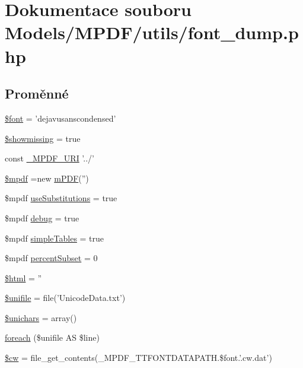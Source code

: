 \hypertarget{font__dump_8php}{\section{Dokumentace souboru Models/\-M\-P\-D\-F/utils/font\-\_\-dump.php}
\label{font__dump_8php}
}
\subsection*{Proměnné}
\begin{DoxyCompactItemize}
\item 
\hyperlink{font__dump_8php_a9d63b61d7d442048fe453731932c6aed}{\$font} = 'dejavusanscondensed'
\item 
\hyperlink{font__dump_8php_a78088e1469eb7590d2db044605ed9875}{\$showmissing} = true
\item 
const \hyperlink{font__dump_8php_a1ff50e3d84f8270d034f2e9d99c147c0}{\-\_\-\-M\-P\-D\-F\-\_\-\-U\-R\-I} '../'
\item 
\hyperlink{font__dump_8php_ad028f81910d6cbab9b184d2214b3a8f8}{\$mpdf} =new \hyperlink{classm_p_d_f}{m\-P\-D\-F}('')
\item 
\$mpdf \hyperlink{font__dump_8php_aa2ce4c2c0ab99d3365e4d7366a9be33a}{use\-Substitutions} = true
\item 
\$mpdf \hyperlink{font__dump_8php_a200a436f1833a712239f1ae5bec608db}{debug} = true
\item 
\$mpdf \hyperlink{font__dump_8php_a87bf4d3d8114a506fea7f0fc5f0714f6}{simple\-Tables} = true
\item 
\$mpdf \hyperlink{font__dump_8php_a6a35a9ff62c890b69a1774f6435e4e6d}{percent\-Subset} = 0
\item 
\hyperlink{font__dump_8php_ac4bf829c24b00f00ff9d3498539e1f4b}{\$html} = ''
\item 
\hyperlink{font__dump_8php_abaa85dced3638e9abc7f47111f04df8e}{\$unifile} = file('Unicode\-Data.\-txt')
\item 
\hyperlink{font__dump_8php_ab216a6d320faf1beba59f97c9941d866}{\$unichars} = array()
\item 
\hyperlink{font__dump_8php_afa3e0d7f4c07331bb8ee7bd7e2008de6}{foreach} (\$unifile A\-S \$line)
\item 
\hyperlink{font__dump_8php_ac2951b03dbb0317e6c61ec920b7479dc}{\$cw} = file\-\_\-get\-\_\-contents(\-\_\-\-M\-P\-D\-F\-\_\-\-T\-T\-F\-O\-N\-T\-D\-A\-T\-A\-P\-A\-T\-H.\$font.'.cw.\-dat')
\item 

\end{DoxyCompactItemize}
